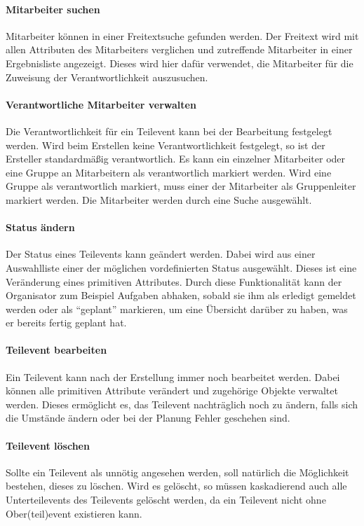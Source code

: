 \paragraph{Mitarbeiter suchen}
Mitarbeiter können in einer Freitextsuche gefunden werden. Der Freitext wird mit allen Attributen des Mitarbeiters verglichen und zutreffende Mitarbeiter in einer Ergebnisliste angezeigt. Dieses wird hier dafür verwendet, die Mitarbeiter für die Zuweisung der Verantwortlichkeit auszusuchen.

\paragraph{Verantwortliche Mitarbeiter verwalten}
Die Verantwortlichkeit für ein Teilevent kann bei der Bearbeitung festgelegt werden. Wird beim Erstellen keine Verantwortlichkeit festgelegt, so ist der Ersteller standardmäßig verantwortlich. Es kann ein einzelner Mitarbeiter oder eine Gruppe an Mitarbeitern als verantwortlich markiert werden. Wird eine Gruppe als verantwortlich markiert, muss einer der Mitarbeiter als Gruppenleiter markiert werden. Die Mitarbeiter werden durch eine Suche ausgewählt.

\paragraph{Status ändern}
Der Status eines Teilevents kann geändert werden. Dabei wird aus einer Auswahlliste einer der möglichen vordefinierten Status ausgewählt. Dieses ist eine Veränderung eines primitiven Attributes. Durch diese Funktionalität kann der Organisator zum Beispiel Aufgaben abhaken, sobald sie ihm als erledigt gemeldet werden oder als \enquote{geplant} markieren, um eine Übersicht darüber zu haben, was er bereits fertig geplant hat.

\paragraph{Teilevent bearbeiten}
Ein Teilevent kann nach der Erstellung immer noch bearbeitet werden. Dabei können alle primitiven Attribute verändert und zugehörige Objekte verwaltet werden. Dieses ermöglicht es, das Teilevent nachträglich noch zu ändern, falls sich die Umstände ändern oder bei der Planung Fehler geschehen sind.

\paragraph{Teilevent löschen}
Sollte ein Teilevent als unnötig angesehen werden, soll natürlich die Möglichkeit bestehen, dieses zu löschen. Wird es gelöscht, so müssen kaskadierend auch alle Unterteilevents des Teilevents gelöscht werden, da ein Teilevent nicht ohne Ober(teil)event existieren kann.

